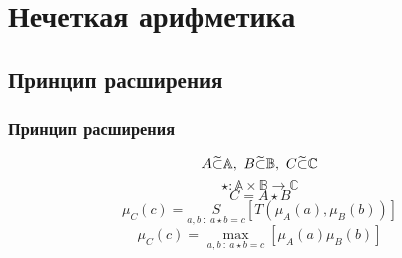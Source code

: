 \documentclass[24pt,pdf,hyperref={unicode}]{beamer}
\begin{document}
\section{Нечеткая арифметика}

\subsection{Принцип расширения}

\begin{frame}\frametitle{Принцип расширения}
$$
A\fsubset\mathbb{A},\ B\fsubset\mathbb{B},\ C\fsubset\mathbb{C}
$$
$$
\star:\mathbb{A}\times\mathbb{B}\rightarrow\mathbb{C}
$$
$$
C=A\star B
$$
$$
\mu_C(c)=\underset{a,b\ :\ a\star b=c}S\left[T(\mu_A(a),\mu_B(b))\right]
$$
$$
\mu_C(c)=\max_{a,b\ :\ a\star b=c}\left[\mu_A(a)\mu_B(b)\right]
$$
\end{frame}
\end{document}
